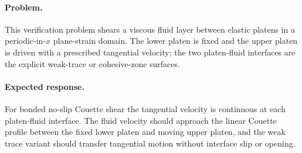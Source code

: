 \paragraph{Problem.}
This verification problem shears a viscous fluid layer between elastic platens
in a periodic-in-$x$ plane-strain domain.  The lower platen is fixed and the
upper platen is driven with a prescribed tangential velocity; the two
platen-fluid interfaces are the explicit weak-trace or cohesive-zone surfaces.

\paragraph{Expected response.}
For bonded no-slip Couette shear the tangential velocity is continuous at each
platen-fluid interface.  The fluid velocity should approach the linear Couette
profile between the fixed lower platen and moving upper platen, and the weak
trace variant should transfer tangential motion without interface slip or
opening.

